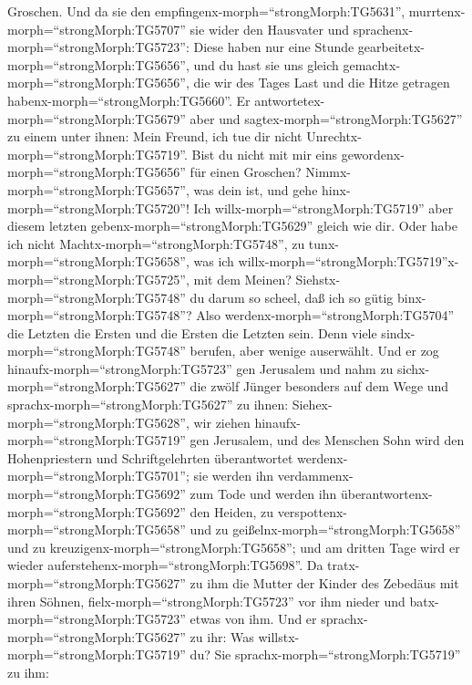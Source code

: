 Groschen.  Und da sie den
empfingenx-morph=``strongMorph:TG5631'',
murrtenx-morph=``strongMorph:TG5707'' sie wider den Hausvater
 und sprachenx-morph=``strongMorph:TG5723'': Diese haben
nur eine Stunde gearbeitetx-morph=``strongMorph:TG5656'', und du hast
sie uns gleich gemachtx-morph=``strongMorph:TG5656'', die wir des Tages
Last und die Hitze getragen habenx-morph=``strongMorph:TG5660''.
 Er antwortetex-morph=``strongMorph:TG5679'' aber und
sagtex-morph=``strongMorph:TG5627'' zu einem unter ihnen: Mein Freund,
ich tue dir nicht Unrechtx-morph=``strongMorph:TG5719''. Bist du nicht
mit mir eins gewordenx-morph=``strongMorph:TG5656'' für einen Groschen?
 Nimmx-morph=``strongMorph:TG5657'', was dein ist, und gehe
hinx-morph=``strongMorph:TG5720''! Ich
willx-morph=``strongMorph:TG5719'' aber diesem letzten
gebenx-morph=``strongMorph:TG5629'' gleich wie dir.  Oder
habe ich nicht Machtx-morph=``strongMorph:TG5748'', zu
tunx-morph=``strongMorph:TG5658'', was ich
willx-morph=``strongMorph:TG5719''\textbar x-morph=``strongMorph:TG5725'',
mit dem Meinen? Siehstx-morph=``strongMorph:TG5748'' du darum so scheel,
daß ich so gütig binx-morph=``strongMorph:TG5748''?  Also
werdenx-morph=``strongMorph:TG5704'' die Letzten die Ersten und die
Ersten die Letzten sein. Denn viele sindx-morph=``strongMorph:TG5748''
berufen, aber wenige auserwählt.  Und er zog
hinaufx-morph=``strongMorph:TG5723'' gen Jerusalem und nahm zu
sichx-morph=``strongMorph:TG5627'' die zwölf Jünger besonders auf dem
Wege und sprachx-morph=``strongMorph:TG5627'' zu ihnen: 
Siehex-morph=``strongMorph:TG5628'', wir ziehen
hinaufx-morph=``strongMorph:TG5719'' gen Jerusalem, und des Menschen
Sohn wird den Hohenpriestern und Schriftgelehrten überantwortet
werdenx-morph=``strongMorph:TG5701''; sie werden ihn
verdammenx-morph=``strongMorph:TG5692'' zum Tode  und
werden ihn überantwortenx-morph=``strongMorph:TG5692'' den Heiden, zu
verspottenx-morph=``strongMorph:TG5658'' und zu
geißelnx-morph=``strongMorph:TG5658'' und zu
kreuzigenx-morph=``strongMorph:TG5658''; und am dritten Tage wird er
wieder auferstehenx-morph=``strongMorph:TG5698''.  Da
tratx-morph=``strongMorph:TG5627'' zu ihm die Mutter der Kinder des
Zebedäus mit ihren Söhnen, fielx-morph=``strongMorph:TG5723'' vor ihm
nieder und batx-morph=``strongMorph:TG5723'' etwas von ihm.
 Und er sprachx-morph=``strongMorph:TG5627'' zu ihr: Was
willstx-morph=``strongMorph:TG5719'' du? Sie
sprachx-morph=``strongMorph:TG5719'' zu ihm:
